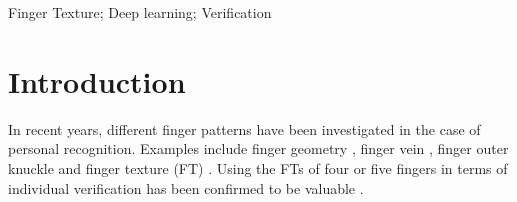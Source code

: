 \documentclass[conference]{IEEEtran}
\begin{document}
\begin{IEEEkeywords}
Finger Texture; Deep learning; Verification
\end{IEEEkeywords}

\section{Introduction}
In recent years, different finger patterns have been investigated in the case of personal recognition. Examples include finger geometry \cite{Liu2015Hand}, finger vein \cite{Lu2014Finger}, finger outer knuckle \cite{Kumar2014Importance} and finger texture (FT) \cite{Al-Nima2017finger, Al-Nima2017Robust}. Using the FTs of four or five fingers in terms of individual verification has been confirmed to be valuable \cite{Al-Nima2017efficient} \cite{Al-Nima2016ANovel} \cite{Al-Nima2015Human}. 
\end{document}
